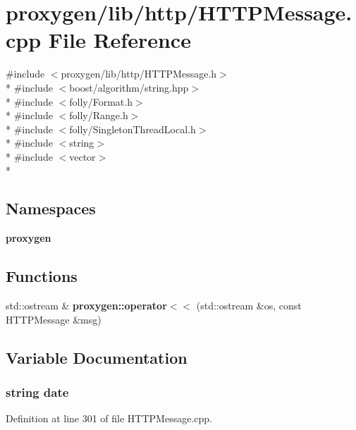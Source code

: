 \section{proxygen/lib/http/\+H\+T\+T\+P\+Message.cpp File Reference}
\label{HTTPMessage_8cpp}
{\ttfamily \#include $<$proxygen/lib/http/\+H\+T\+T\+P\+Message.\+h$>$}\\*
{\ttfamily \#include $<$boost/algorithm/string.\+hpp$>$}\\*
{\ttfamily \#include $<$folly/\+Format.\+h$>$}\\*
{\ttfamily \#include $<$folly/\+Range.\+h$>$}\\*
{\ttfamily \#include $<$folly/\+Singleton\+Thread\+Local.\+h$>$}\\*
{\ttfamily \#include $<$string$>$}\\*
{\ttfamily \#include $<$vector$>$}\\*
\subsection*{Namespaces}
\begin{DoxyCompactItemize}
\item 
 {\bf proxygen}
\end{DoxyCompactItemize}
\subsection*{Functions}
\begin{DoxyCompactItemize}
\item 
std\+::ostream \& {\bf proxygen\+::operator$<$$<$} (std\+::ostream \&os, const H\+T\+T\+P\+Message \&msg)
\end{DoxyCompactItemize}


\subsection{Variable Documentation}
\subsubsection[{date}]{\setlength{\rightskip}{0pt plus 5cm}string date}\label{HTTPMessage_8cpp_a988e6c0d8b2a9807e4271ed921cd529b}


Definition at line 301 of file H\+T\+T\+P\+Message.\+cpp.



